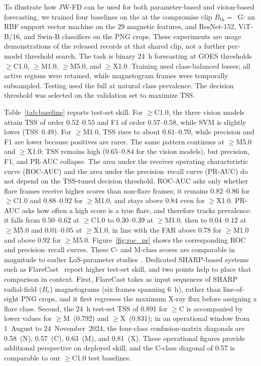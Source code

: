 \documentclass[universe,article,submit,moreauthors]{Definitions/mdpi}
\newif\ifrevision
\newcommand{\add}[1]{\ifrevision\textcolor{blue}{#1}\else#1\fi}
\newcommand{\del}[1]{\ifrevision\textcolor{red}{\sout{#1}}\else\fi}
\newcommand{\chg}[2]{\del{#1}\add{#2}}
\begin{document}
To illustrate how JW-FD can be used for both parameter-based and vision-based forecasting, we trained four baselines on the \chg{seed-62 AR-level assignment}{seed~3970 AR-level assignment} at the compromise clip $B_{\mathrm{th}}={}$\chg{1000}{800}~G: an RBF support vector machine on the 29 magnetic features, and ResNet-152, ViT-B/16, and Swin-B classifiers on the PNG crops. These experiments are usage demonstrations of the released records at that shared clip, not a further per-model threshold search. The task is binary 24~h forecasting at GOES thresholds $\geq$C1.0, $\geq$M1.0, $\geq$M5.0, and $\geq$X1.0. Training used class-balanced losses; all active regions were retained, while magnetogram frames were temporally subsampled. Testing used the full \chg{204{,}920-frame seed-62 test partition}{196{,}846-frame test partition} at natural class prevalence. The decision threshold was selected on the validation set to maximize TSS. \del{These scores are an internal reference on the initial random split. They will be replaced once the same four models are retrained on the released 19-AR assignment (test 206,079 frames).}

Table~\ref{tab:baseline} reports test-set skill. For $\geq$C1.0, the three vision models attain TSS of order $0.52$--$0.55$ and F1 of order $0.57$--$0.58$, while SVM is slightly lower (TSS~$0.49$). For $\geq$M1.0, TSS rises to about $0.61$--$0.70$, while precision and F1 are lower because positives are rarer. The same pattern continues at $\geq$M5.0 and $\geq$X1.0: TSS remains high ($0.65$--$0.84$ for the vision models), but precision, F1, and PR-AUC collapse. The area under the receiver operating characteristic curve (ROC-AUC) and the area under the precision--recall curve (PR-AUC) do not depend on the TSS-tuned decision threshold. ROC-AUC asks only whether flare frames receive higher scores than non-flare frames; it remains $0.82$--$0.86$ for $\geq$C1.0 and $0.88$--$0.92$ for $\geq$M1.0, and stays above $0.84$ even for $\geq$X1.0. PR-AUC asks how often a high score is a true flare, and therefore tracks prevalence: it falls from $0.50$--$0.62$ at $\geq$C1.0 to $0.30$--$0.39$ at $\geq$M1.0, then to $0.04$--$0.12$ at $\geq$M5.0 and $0.01$--$0.05$ at $\geq$X1.0, in line with the FAR above $0.78$ for $\geq$M1.0 and above $0.92$ for $\geq$M5.0. \add{Figure~\ref{fig:roc_pr} shows the corresponding ROC and precision--recall curves.} These C- and M-class scores are comparable in magnitude to earlier LoS-parameter studies~\cite{AlGhraibah2015}. Dedicated SHARP-based systems such as FlareCast~\cite{Lv2026} report higher test-set skill, and two points help to place that comparison in context. First, FlareCast takes as input sequences of SHARP radial-field ($B_r$) magnetograms (six frames spanning 6~h), rather than line-of-sight PNG crops, and it first regresses the maximum X-ray flux before assigning a flare class. Second, the 24~h test-set TSS of 0.891 for $\geq$C is accompanied by lower values for $\geq$M~(0.792) and $\geq$X~(0.831); in an operational window from 1~August to 24~November~2024, the four-class confusion-matrix diagonals are 0.58~(N), 0.57~(C), 0.63~(M), and 0.81~(X). These operational figures provide additional perspective on deployed skill, and the C-class diagonal of 0.57 is comparable to our $\geq$C1.0 test baselines.
\end{document}
